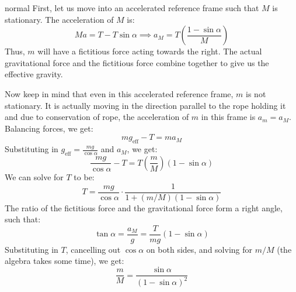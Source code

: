 \begin{solution}{normal}
First, let us move into an accelerated reference frame such that $M$ is stationary. The acceleration of $M$ is:
$$Ma=T-T\sin\alpha \implies a_M = T\left(\frac{1-\sin\alpha}{M}\right)$$
Thus, $m$ will have a fictitious force acting towards the right. The actual gravitational force and the fictitious force combine together to give us the effective gravity.

Now keep in mind that even in this accelerated reference frame, $m$ is not stationary. It is actually moving in the direction parallel to the rope holding it and due to conservation of rope, the acceleration of $m$ in this frame is $a_m=a_M$. Balancing forces, we get:
$$mg_\text{eff}-T=ma_M$$
Substituting in $g_\text{eff}=\frac{mg}{\cos\alpha}$ and $a_M$, we get:
$$\frac{mg}{\cos\alpha}-T=T\left(\frac{m}{M}\right)(1-\sin\alpha)$$
We can solve for $T$ to be:
$$T = \frac{mg}{\cos\alpha} \cdot \frac{1}{1+(m/M)(1-\sin\alpha)}$$
The ratio of the fictitious force and the gravitational force form a right angle, such that:
$$\tan\alpha = \frac{a_M}{g} = \frac{T}{mg}(1-\sin\alpha)$$
Substituting in $T$, cancelling out $\cos\alpha$ on both sides, and solving for $m/M$ (the algebra takes some time), we get:
$$\boxed{\frac{m}{M}}=\frac{\sin\alpha}{(1-\sin\alpha)^2}$$
\end{solution}
